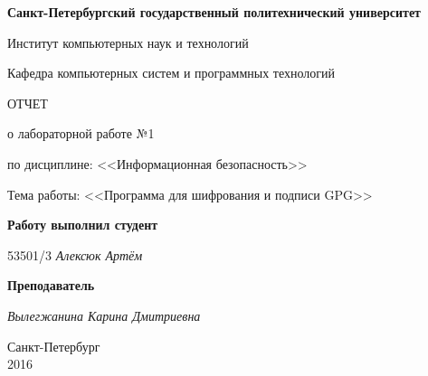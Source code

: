\begin{titlepage}
\begin{center}

\textbf{Санкт-Петербургский государственный политехнический университет}

\vspace{5mm}
Институт компьютерных наук и технологий

\vspace{5mm}
Кафедра компьютерных систем и программных технологий

\vspace*{\fill}

\huge{ОТЧЕТ}

\Large{о лабораторной работе №1}
\vspace{2mm}

\large{по дисциплине: <<Информационная безопасность>>}

\vspace*{2mm}
\large{Тема работы: <<Программа для шифрования и подписи GPG>>}

\vspace*{\fill}
\end{center}

\begin{large}
\hspace{0.25\linewidth} \textbf{Работу выполнил студент}

\vspace{5mm}
\hspace{0.25\linewidth} 53501/3 \hspace{5mm} \textit{Алексюк Артём}

\vspace{3mm}
\hspace{0.25\linewidth} \textbf{Преподаватель}

\vspace{5mm}
\hspace{0.25\linewidth} \underline{\hspace{2cm} } \hspace{3mm} \textit{Вылегжанина Карина Дмитриевна}
\end{large}

\vspace*{3cm}

\begin{center}
\normalsize Санкт-Петербург\\2016
\end{center}
\end{titlepage}